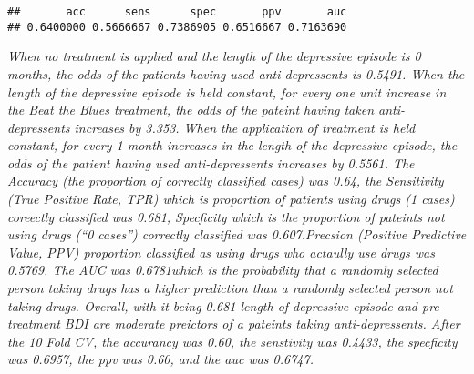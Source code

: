 \documentclass[
]{article}
\newenvironment{Shaded}{\begin{snugshade}}{\end{snugshade}}
\newcommand{\ControlFlowTok}[1]{\textcolor[rgb]{0.13,0.29,0.53}{\textbf{#1}}}
\newcommand{\DataTypeTok}[1]{\textcolor[rgb]{0.13,0.29,0.53}{#1}}
\newcommand{\DecValTok}[1]{\textcolor[rgb]{0.00,0.00,0.81}{#1}}
\newcommand{\KeywordTok}[1]{\textcolor[rgb]{0.13,0.29,0.53}{\textbf{#1}}}
\newcommand{\NormalTok}[1]{#1}
\newcommand{\OperatorTok}[1]{\textcolor[rgb]{0.81,0.36,0.00}{\textbf{#1}}}
\newcommand{\OtherTok}[1]{\textcolor[rgb]{0.56,0.35,0.01}{#1}}
\newcommand{\StringTok}[1]{\textcolor[rgb]{0.31,0.60,0.02}{#1}}
\begin{document}
\begin{Shaded}
\end{Shaded}

\begin{verbatim}
##       acc      sens      spec       ppv       auc 
## 0.6400000 0.5666667 0.7386905 0.6516667 0.7163690
\end{verbatim}

\emph{When no treatment is applied and the length of the depressive
episode is 0 months, the odds of the patients having used
anti-depressents is 0.5491. When the length of the depressive episode is
held constant, for every one unit increase in the Beat the Blues
treatment, the odds of the pateint having taken anti-depressents
increases by 3.353. When the application of treatment is held constant,
for every 1 month increases in the length of the depressive episode, the
odds of the patient having used anti-depressents increases by 0.5561.
The Accuracy (the proportion of correctly classified cases) was 0.64,
the Sensitivity (True Positive Rate, TPR) which is proportion of
patients using drugs (1 cases) coreectly classified was 0.681,
Specficity which is the proportion of pateints not using drugs (``0
cases'') correctly classified was 0.607.Precsion (Positive Predictive
Value, PPV) proportion classified as using drugs who actaully use drugs
was 0.5769. The AUC was 0.6781which is the probability that a randomly
selected person taking drugs has a higher prediction than a randomly
selected person not taking drugs. Overall, with it being 0.681 length of
depressive episode and pre-treatment BDI are moderate preictors of a
pateints taking anti-depressents. After the 10 Fold CV, the accurancy
was 0.60, the senstivity was 0.4433, the specficity was 0.6957, the ppv
was 0.60, and the auc was 0.6747.}
\end{document}
